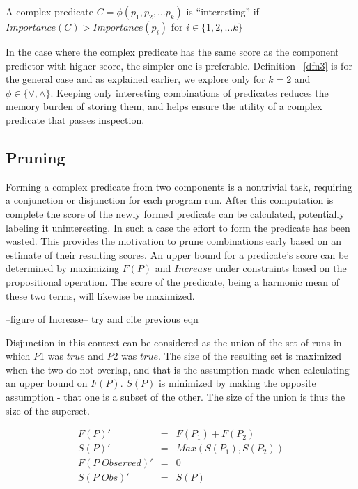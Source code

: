 \begin{defn}
\label{dfn3}
A complex predicate $C = \phi(p_1, p_2, \ldots p_k)$ is ``interesting'' if $Importance(C) > Importance(p_i)$ for $i \in \{1, 2, \ldots k\}$
\end{defn}

In the case where the complex predicate has the same score as the component predictor with higher score, the simpler one is preferable.  Definition ~\ref{dfn3} is for the general case and as explained earlier, we explore only for $k = 2$ and $\phi \in \{\vee, \wedge\}$.  Keeping only interesting combinations of predicates reduces the memory burden of storing them, and helps ensure the utility of a complex predicate that passes inspection.

\subsection{Pruning}
Forming a complex predicate from two components is a nontrivial task, requiring a conjunction or disjunction for each program run.  After this computation is complete the score of the newly formed predicate can be calculated, potentially labeling it uninteresting.  In such a case the effort to form the predicate has been wasted.  This provides the motivation to prune combinations early based on an estimate of their resulting scores.  An upper bound for a predicate's score can be determined by maximizing $F(P)$ and $Increase$ under constraints based on the propositional operation.  The score of the predicate, being a harmonic mean of these two terms, will likewise be maximized.

--figure of Increase-- try and cite previous eqn

Disjunction in this context can be considered as the union of the set of runs in which $P1$ was $true$ and $P2$ was $true$.  The size of the resulting set is maximized when the two do not overlap, and that is the assumption made when calculating an upper bound on $F(P)$.  $S(P)$ is minimized by making the opposite assumption - that one is a subset of the other.  The size of the union is thus the size of the superset.

\begin{eqnarray}
 \nonumber %
  F(P)' &=&  F(P_1) + F(P_2) \\
 \nonumber
  S(P)' &=&  Max(S(P_1),S(P_2)) \\
 \nonumber
  F(P\;Observed)' &=& 0 \\
 \nonumber
  S(P\;Obs)' &=& S(P)
\end{eqnarray}

